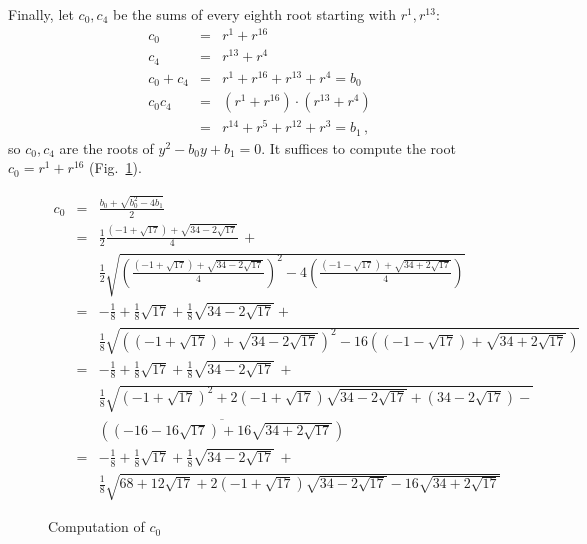 Finally, let $c_0,c_4$ be the sums of every eighth root starting with $r^1,r^{13}$:
\begin{eqnarray*}
c_0&=&r^1+r^{16}\\
c_4&=&r^{13}+r^4\\
c_0+c_4&=&r^1+r^{16}+r^{13}+r^4=b_0\\
c_0c_4&=&(r^1+r^{16})\cdot(r^{13}+r^4)\\
&=&r^{14}+r^5+r^{12}+r^3=b_1\,,
\end{eqnarray*}
so $c_0,c_4$ are the roots of $y^2-b_0y+b_1=0$. It suffices to compute the root $c_0=r^1+r^{16}$ (Fig.~\ref{fig.c0}).
\begin{figure}[t]
\begin{eqnarray*}
c_0&=&\frac{b_0+\sqrt{b_0^2-4b_1}}{2}\\
&=&\frac{1}{2}
     \frac{
     (-1+\sqrt{17}) + 
     \sqrt{34-2\sqrt{17}}
   }{4}\,+ \\
&& 
    \frac{1}{2}
       \sqrt{\left(\frac{
     (-1+\sqrt{17}) + 
     \sqrt{34-2\sqrt{17}}
   }{4}\right)^2-4\left(\frac{
     (-1-\sqrt{17}) + 
     \sqrt{34+2\sqrt{17}}
   }{4}\right)}
   \\
&=&-\frac{1}{8}+\frac{1}{8}\sqrt{17} + 
     \frac{1}{8}\sqrt{34-2\sqrt{17}}
    + \\
   &&
     \frac{1}{8}\sqrt{
     \left(
     (-1+\sqrt{17}) + 
     \sqrt{34-2\sqrt{17}}
   \right)^2-16\left(
     (-1-\sqrt{17}) + 
     \sqrt{34+2\sqrt{17}}
   \right)}
\\
&=&-\frac{1}{8}+\frac{1}{8}\sqrt{17} + 
     \frac{1}{8}\sqrt{34-2\sqrt{17}}
   \, + \\
   &&
     \frac{1}{8}\sqrt{
     (-1+\sqrt{17})^2 + 
     2(-1+\sqrt{17})\sqrt{34-2\sqrt{17}}+
     (34-2\sqrt{17})
   -}\\
   &&\overline{
     \left((-16-16\sqrt{17}) + 
     16\sqrt{34+2\sqrt{17}}\right)
   }
\\
&=&-\frac{1}{8}+\frac{1}{8}\sqrt{17} + 
     \frac{1}{8}\sqrt{34-2\sqrt{17}}
    \,+ \\
   &&
     \frac{1}{8}\sqrt{
     68+12\sqrt{17} + 
     2(-1+\sqrt{17})\sqrt{34-2\sqrt{17}}
   -16
     \sqrt{34+2\sqrt{17}}
   }
\end{eqnarray*}
\caption{Computation of $c_0$}\label{fig.c0}
\end{figure}

